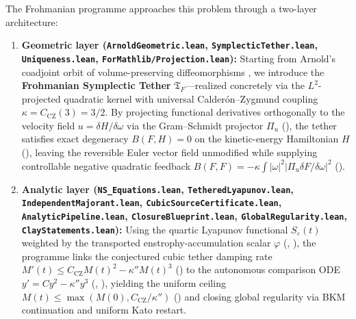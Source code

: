\documentclass[11pt,a4paper]{article}
\theoremstyle{plain}
\theoremstyle{definition}
\theoremstyle{remark}
\newcommand{\Tf}{\mathfrak{T}_F}
\newcommand{\CZ}{C_{\mathrm{CZ}}}
\begin{document}
The Frohmanian programme approaches this problem through a two-layer architecture:
\begin{enumerate}
\item \textbf{Geometric layer (\texttt{ArnoldGeometric.lean}, \texttt{SymplecticTether.lean}, \texttt{Uniqueness.lean}, \texttt{ForMathlib/Projection.lean}):} Starting from Arnold's coadjoint orbit of volume-preserving diffeomorphisms \cite{Arnold1966,ArnoldKhesin1998}, we introduce the \textbf{Frohmanian Symplectic Tether} $\Tf$—realized concretely via the $L^2$-projected quadratic kernel  with universal Calderón--Zygmund coupling $\kappa=\CZ(3)=3/2$. By projecting functional derivatives orthogonally to the velocity field $u=\delta H/\delta\omega$ via the Gram--Schmidt projector $\Pi_u$ (), the tether satisfies exact degeneracy $B(F,H)=0$ on the kinetic-energy Hamiltonian $H$ (), leaving the reversible Euler vector field unmodified while supplying controllable negative quadratic feedback $B(F,F)=-\kappa\int|\omega|^2|\Pi_u\delta F/\delta\omega|^2$ ().
\item \textbf{Analytic layer (\texttt{NS\_Equations.lean}, \texttt{TetheredLyapunov.lean}, \texttt{IndependentMajorant.lean}, \texttt{CubicSourceCertificate.lean}, \texttt{AnalyticPipeline.lean}, \texttt{ClosureBlueprint.lean}, \texttt{GlobalRegularity.lean}, \texttt{ClayStatements.lean}):} Using the quartic Lyapunov functional $S_\varepsilon(t)$ weighted by the transported enstrophy-accumulation scalar $\varphi$ (, ), the programme links the conjectured cubic tether damping rate $M'(t)\le \CZ M(t)^2-\kappa'' M(t)^3$ () to the autonomous comparison ODE $y'=Cy^2-\kappa''y^3$ (, ), yielding the uniform ceiling $M(t)\le\max(M(0),\CZ/\kappa'')$ () and closing global regularity via BKM continuation and uniform Kato restart.
\end{enumerate}
\end{document}
